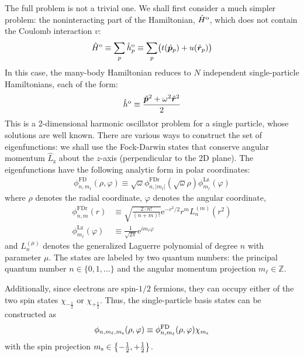 The full problem is not a trivial one.  We shall first consider a much simpler problem: the noninteracting part of the Hamiltonian, $\hat H^{\text o}$, which does not contain the Coulomb interaction $v$:
\begin{align} \label{eq:onebodyhamiltonian}
  \hat H^{\text o} \equiv \sum_p \hat h^{\text o}_p
  \equiv \sum_{p} \bigl(
  t(\hat{\bm p}_p) + u(\hat{\bm r}_p)
  \bigr)
\end{align}
In this case, the many-body Hamiltonian reduces to $N$ independent
single-particle Hamiltonians, each of the form:
\begin{align*}
  \hat h^{\text o} \equiv
  \frac{\hat{\bm p}^2 + \omega^2 \hat{\bm r}^2}{2}
\end{align*}
This is a 2-dimensional harmonic oscillator problem for a single particle,
whose solutions are well known.  There are various ways to construct the set
of eigenfunctions: we shall use the Fock-Darwin states that conserve angular
momentum $\hat{L}_{\text{z}}$ about the $z$-axis (perpendicular to the 2D
plane).  The eigenfunctions have the following analytic form in polar
coordinates:\citep[Appx.\ A]{lohne2010coupled}
\begin{gather*}
  \phi^{\text{FD}}_{n, m_\ell}(\rho, \varphi)
  \equiv \sqrt\omega
  \phi^{\text{FDr}}_{n, |m_\ell|}(\sqrt \omega \rho)
  \phi^{\text{Lz}}_{m_\ell}(\varphi)
\end{gather*}
where $\rho$ denotes the radial coordinate, $\varphi$ denotes the angular coordinate,
\begin{align*}
  \phi^{\text{FDr}}_{n, m}(r) &\equiv
  \sqrt{\frac{2 \cdot n!}{(n + m)!}}
  {\mathrm e}^{-r^2 / 2} r^m L_n^{(m)}(r^2) \\
  \phi^{\text{Lz}}_{m_\ell}(\varphi) &\equiv
  \frac{1}{\sqrt{2 \pi}} {\mathrm e}^{i m_\ell \varphi}
\end{align*}
and $L_n^{(\mu)}$ denotes the generalized Laguerre polynomial of degree $n$
with parameter $\mu$.  The states are labeled by two quantum numbers: the
principal quantum number $n \in \{0, 1, \ldots\}$ and the angular momentum
projection $m_\ell \in \mathbb Z$.

Additionally, since electrons are spin-$1/2$ fermions, they can occupy either
of the two spin states $\chi_{-\frac12}$ or $\chi_{+\frac12}$.  Thus, the
single-particle basis states can be constructed as
\begin{align} \label{eq:singleparticlestate}
  \phi_{n, m_\ell, m_{\text s}}(\rho, \varphi) \equiv
  \phi^{\text{FD}}_{n, m_\ell}(\rho, \varphi) \chi_{m_{\text s}}
\end{align}
with the spin projection $m_{\text s} \in \bigl\{-\frac12, +\frac12\bigr\}$.

